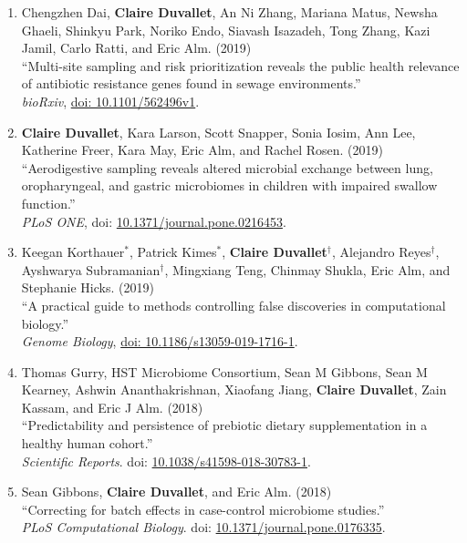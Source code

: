 \documentclass[10pt]{article}
\makeatletter
\newlength{\bibhang}
\newlength{\bibsep}
 {\@listi \global\bibsep\itemsep \global\advance\bibsep by\parsep}
\newenvironment{bibsection}%
        {\begin{enumerate}{}{%
       \setlength{\leftmargin}{\bibhang}%
       \setlength{\itemindent}{-\leftmargin}%
       \setlength{\itemsep}{\bibsep}%
       \setlength{\parsep}{\z@}%
        \setlength{\partopsep}{0pt}%
        \setlength{\topsep}{0pt}}}
        {\end{enumerate}\vspace{-.6\baselineskip}}
\makeatother
\begin{document}
\begin{bibsection}
	\item Chengzhen Dai, \textbf{Claire Duvallet}, An Ni Zhang, Mariana Matus, Newsha Ghaeli, Shinkyu Park, Noriko Endo, Siavash Isazadeh, Tong Zhang, Kazi Jamil, Carlo Ratti, and Eric Alm. (2019) \\
	``Multi-site sampling and risk prioritization reveals the public health relevance of antibiotic resistance genes found in sewage environments.''  \\
	\textit{bioRxiv},  \href{https://www.biorxiv.org/content/10.1101/562496v1}{doi: 10.1101/562496v1}.
					
	\item \textbf{Claire Duvallet}, Kara Larson, Scott Snapper, Sonia Iosim, Ann Lee, Katherine Freer, Kara May, Eric Alm, and Rachel Rosen. (2019) \\ 
		``Aerodigestive sampling reveals altered microbial exchange between lung, oropharyngeal, and gastric microbiomes in children with impaired swallow function.'' \\ 
		\textit{PLoS ONE}, doi: \href{https://doi.org/10.1371/journal.pone.0216453}{10.1371/journal.pone.0216453}.
	
	\item Keegan Korthauer$^{*}$, Patrick Kimes$^{*}$, \textbf{Claire Duvallet}$^{\dagger}$,  Alejandro Reyes$^{\dagger}$,  Ayshwarya Subramanian$^{\dagger}$, Mingxiang Teng, Chinmay Shukla, Eric Alm, and Stephanie Hicks. (2019) \\
		``A practical guide to methods controlling false discoveries in computational biology.''  \\
		\textit{Genome Biology}, \href{https://doi.org/10.1186/s13059-019-1716-1}{doi: 10.1186/s13059-019-1716-1}.
		
	\item Thomas Gurry, HST Microbiome Consortium, Sean M Gibbons, Sean M Kearney, Ashwin Ananthakrishnan, Xiaofang Jiang, \textbf{Claire Duvallet}, Zain Kassam, and Eric J Alm. (2018) \\ 
		``Predictability and persistence of prebiotic dietary supplementation in a healthy human cohort.''  \\ 
		\emph{Scientific Reports}. doi: \href{https://doi.org/10.1038/s41598-018-30783-1}{10.1038/s41598-018-30783-1}.

	\item Sean Gibbons, \textbf{Claire Duvallet}, and Eric Alm.  (2018) \\ 
		``Correcting for batch effects in case-control microbiome studies.''  \\ 
		\emph{PLoS Computational Biology}. doi: \href{https://doi.org/10.1371/journal.pcbi.1006102}{10.1371/journal.pone.0176335}.
		

\end{bibsection}
\end{document}
